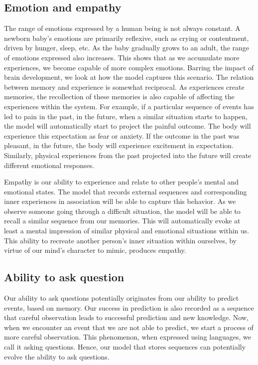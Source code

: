 \documentclass[reprint,amsmath,amssymb,apr,aip,onecolumn, 11pt]{revtex4-1}
\begin{document}
\subsection{Emotion and empathy}
The range of emotions expressed by a human being is not always constant. A newborn baby's emotions are primarily reflexive, such as crying or contentment, driven by hunger, sleep, etc. As the baby gradually grows to an adult, the range of emotions expressed also increases\cite{Berk_2017}. This shows that as we accumulate more experiences, we become capable of more complex emotions. Barring the impact of brain development, we look at how the model captures this scenario. The relation between memory and experience is somewhat reciprocal. As experiences create memories, the recollection of these memories is also capable of affecting the experiences within the system. For example, if a particular sequence of events has led to pain in the past, in the future, when a similar situation starts to happen, the model will automatically start to project the painful outcome. The body will experience this expectation as fear or anxiety. If the outcome in the past was pleasant, in the future, the body will experience excitement in expectation. Similarly, physical experiences from the past projected into the future will create different emotional responses.

Empathy is our ability to experience and relate to other people's mental and emotional states. The model that records external sequences and corresponding inner experiences in association will be able to capture this behavior. As we observe someone going through a difficult situation, the model will be able to recall a similar sequence from our memories. This will automatically evoke at least a mental impression of similar physical and emotional situations within us. This ability to recreate another person's inner situation within ourselves, by virtue of our mind's character to mimic, produces empathy.  

\subsection{Ability to ask question}
Our ability to ask questions potentially originates from our ability to predict events, based on memory. Our success in prediction is also recorded as a sequence that careful observation leads to successful prediction and new knowledge. Now, when we encounter an event that we are not able to predict, we start a process of more careful observation. This phenomenon, when expressed using languages, we call it asking questions. Hence, our model that stores sequences can potentially evolve the ability to ask questions. 
\end{document}

